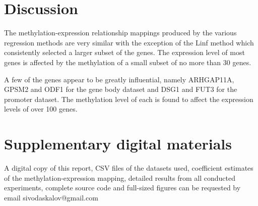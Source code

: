 \section{Discussion}
The methylation-expression relationship mappings produced by the various regression methods are very similar with the exception of the Linf method which consistently selected a larger subset of the genes. The expression level of most genes is affected by the methylation of a small subset of no more than 30 genes. 

A few of the genes appear to be greatly influential, namely ARHGAP11A, GPSM2 and ODF1 for the gene body dataset and DSG1 and FUT3 for the promoter dataset. The methylation level of each is found to affect the expression levels of over 100 genes.
\pagebreak


\section{Supplementary digital materials}
A digital copy of this report, CSV files of the datasets used, coefficient estimates of the methylation-expression mapping, detailed results from all conducted experiments, complete source code and full-sized figures can be requested by email sivodaskalov@gmail.com